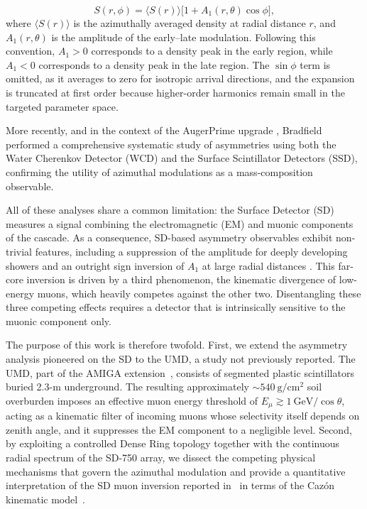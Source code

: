 \documentclass[11pt,a4paper]{article}
\begin{document}
\begin{equation}
    S(r, \phi) = \langle S(r)\rangle \big[ 1 + A_1(r, \theta) \cos \phi \big] ,
    \label{eq:harmonic_fit}
\end{equation}
%
where $\langle S(r)\rangle$ is the azimuthally averaged density at radial distance $r$, and $A_1(r, \theta)$ is the amplitude of the early–late modulation. Following this convention, $A_1 > 0$ corresponds to a density peak in the early region, while $A_1 < 0$ corresponds to a density peak in the late region. The $\sin \phi$ term is omitted, as it averages to zero for isotropic arrival directions, and the expansion is truncated at first order because higher-order harmonics remain small in the targeted parameter space. 

More recently, and in the context of the AugerPrime upgrade \cite{AugerPrime2016}, Bradfield \cite{BradfieldThesis} performed a comprehensive systematic study of asymmetries using both the Water Cherenkov Detector (WCD) and the Surface Scintillator Detectors (SSD), confirming the utility of azimuthal modulations as a mass-composition observable. 

All of these analyses share a common limitation: the Surface Detector (SD) measures a signal combining the electromagnetic (EM) and muonic components of the cascade. As a consequence, SD-based asymmetry observables exhibit non-trivial features, including a suppression of the amplitude for deeply developing showers and an outright sign inversion of $A_1$ at large radial distances \cite{BradfieldThesis, Luce_ICRC2021}. This far-core inversion is driven by a third phenomenon, the kinematic divergence of low-energy muons, which heavily competes against the other two. Disentangling these three competing effects requires a detector that is intrinsically sensitive to the muonic component only.

The purpose of this work is therefore twofold. First, we extend the asymmetry analysis pioneered on the SD to the UMD, a study not previously reported. The UMD, part of the AMIGA extension~\cite{Botti2019, auger2020umd_infill}, consists of segmented plastic scintillators buried 2.3-m underground. The resulting approximately $\sim 540~\mathrm{g/cm^2}$ soil overburden imposes an effective muon energy threshold of $E_\mu \gtrsim 1 ~\mathrm{GeV}/\cos\theta$, acting as a kinematic filter of incoming muons whose selectivity itself depends on zenith angle, and it suppresses the EM component to a negligible level. Second, by exploiting a controlled Dense Ring topology together with the continuous radial spectrum of the SD-750 array, we dissect the competing physical mechanisms that govern the azimuthal modulation and provide a quantitative interpretation of the SD muon inversion reported in~\cite{Luce_ICRC2021} in terms of the Caz\'on kinematic model~\cite{Cazon2012}.
\end{document}
